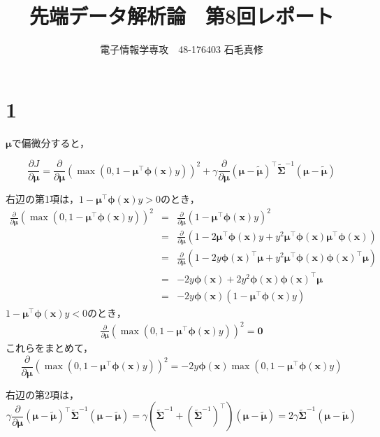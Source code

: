 \documentclass[dvipdfmx]{jsarticle}
\title{先端データ解析論　第8回レポート}
\author{電子情報学専攻　48-176403 石毛真修}
\newcommand{\bmu}{{\bm{\mu}}}
\newcommand{\bmut}{\bm{\mu}^\top}
\newcommand{\tbmu}{\tilde{\bm{\mu}}}
\newcommand{\sig}{\tilde{\bm{\Sigma}}}
\newcommand{\siginv}{\tilde{\bm{\Sigma}}^{-1}}
\newcommand{\bphi}{\bm{\phi}(\bm{x})}
\newcommand{\bphit}{\bm{\phi}(\bm{x})^\top}
\begin{document}
\maketitle

\section*{1}

%
$\bmu$で偏微分すると，

$$
\frac{\partial J}{\partial \bmu} = \frac{\partial}{\partial \bmu} \left(\max (0, 1-\bmut\bphi y) \right)^2 + \gamma \frac{\partial}{\partial \bmu} (\bmu-\tbmu)^\top \siginv (\bmu-\tbmu)
$$

右辺の第1項は，$1-\bmut\bphi y > 0$のとき，
\begin{eqnarray*}
  \frac{\partial}{\partial \bmu} \left(\max (0, 1-\bmut\bphi y) \right)^2 &=& \frac{\partial}{\partial \bmu} \left(1-\bmut\bphi y \right)^2 \\
  &=& \frac{\partial}{\partial \bmu} \left(1 -2\bmut\bphi y + y^2\bmut\bphi\bmut\bphi \right) \\
  &=& \frac{\partial}{\partial \bmu} \left(1 -2y \bphit\bmu + y^2\bmut\bphi\bphit\bmu \right) \\
  &=& -2y\bphi + 2y^2\bphi\bphit\bmu \\
  &=& -2y\bphi\left(1 - \bmut\bphi y\right)
\end{eqnarray*}
$1-\bmut\bphi y < 0$のとき，
\begin{eqnarray*}
  \frac{\partial}{\partial \bmu} \left(\max (0, 1-\bmut\bphi y) \right)^2 = \bm{0}
\end{eqnarray*}
これらをまとめて，
$$
\frac{\partial}{\partial \bmu} \left(\max (0, 1-\bmut\bphi y) \right)^2= -2y\bphi\max\left(0, 1 - \bmut\bphi y\right)
$$


右辺の第2項は，
$$
\gamma \frac{\partial}{\partial \bmu} (\bmu-\tbmu)^\top \siginv (\bmu-\tbmu)　= \gamma \left(\siginv + (\siginv)^\top\right) (\bmu - \tbmu) = 2\gamma \siginv (\bmu - \tbmu)
$$
\end{document}
